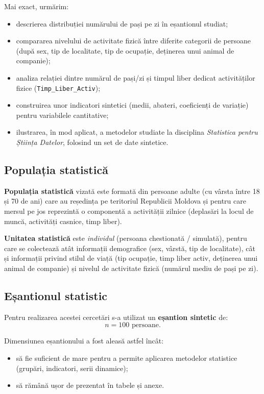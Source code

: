 \documentclass[12pt,a4paper]{report}
\begin{document}
Mai exact, urmărim:
\begin{itemize}[leftmargin=1.2cm]
  \item descrierea distribuției numărului de pași pe zi în eșantionul studiat;
  \item compararea nivelului de activitate fizică între diferite categorii de persoane (după sex, tip de localitate, tip de ocupație, deținerea unui animal de companie);
  \item analiza relației dintre numărul de pași/zi și timpul liber dedicat activităților fizice (\texttt{Timp\_Liber\_Activ});
  \item construirea unor indicatori sintetici (medii, abateri, coeficienți de variație) pentru variabilele cantitative;
  \item ilustrarea, în mod aplicat, a metodelor studiate la disciplina \textit{Statistica pentru Știința Datelor}, folosind un set de date sintetice.
\end{itemize}

\subsection{Populația statistică}

\textbf{Populația statistică} vizată este formată din persoane adulte (cu vârsta între 18 și 70 de ani) care au reședința pe teritoriul Republicii Moldova și pentru care mersul pe jos reprezintă o componentă a activității zilnice (deplasări la locul de muncă, activități casnice, timp liber).

\textbf{Unitatea statistică} este \textit{individul} (persoana chestionată / simulată), pentru care se colectează atât informații demografice (sex, vârstă, tip de localitate), cât și informații privind stilul de viață (tip ocupație, timp liber activ, deținerea unui animal de companie) și nivelul de activitate fizică (numărul mediu de pași pe zi).

\subsection{Eșantionul statistic}

Pentru realizarea acestei cercetări s-a utilizat un \textbf{eșantion sintetic} de:
\[
n = 100 \text{ persoane.}
\]

Dimensiunea eșantionului a fost aleasă astfel încât:
\begin{itemize}[leftmargin=1.2cm]
  \item să fie suficient de mare pentru a permite aplicarea metodelor statistice (grupări, indicatori, serii dinamice);
  \item să rămână ușor de prezentat în tabele și anexe.
\end{itemize}
\end{document}

